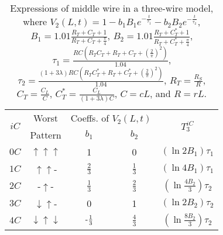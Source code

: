 \documentclass[10pt,journal]{IEEEtran}
\def\d{\downarrow}
\def\u{\uparrow}
\begin{document}
\begin{table}[!t]
\caption{Expressions of middle wire in a three-wire model, where $V_2(L,t) = 1 - b_1 B_1 e^{-\frac{t}{\tau_1}} - b_2 B_2 e^{-\frac{t}{\tau_2}}$, $B_1 = 1.01\frac{R_T+C_T+1}{R_T+C_T+\frac{\pi}{4}}$, $B_2 = 1.01\frac{R_T+C_T^\ast+1}{R_T+C_T^\ast+\frac{\pi}{4}}$, $\tau_1 = \frac{RC(R_TC_T+R_T+C_T+(\frac{2}{\pi})^2)}{1.04}$,  $\tau_2 = \frac{(1+3\lambda) RC(R_TC_T^\ast+R_T+C_T^\ast+(\frac{2}{\pi})^2)}{1.04}$,  $R_T=\frac{R_S}{R}$, $C_T=\frac{C_L}{C}$, $C_T^\ast=\frac{C_L}{(1+3\lambda)C}$, $C=cL$, and $R=rL$.} \label{tab:3dif}
\begin{center}
\begin{tabular}{|c|c|c|c|c|}
\hline
\multirow{2}{*}{$iC$} & Worst & \multicolumn{2}{|c|}{Coeffs. of $V_2(L,t)$} & \multirow{2}{*}{$T_3^{iC}$}\\
\cline{3-4}
& Pattern & $b_1$ & $b_2$ & \\
\hline
$0C$ & $\u\u\u$ & 1 & 0 & $(\ln 2B_1)\tau_1$ \\
\hline
$1C$ & $\u\u$- & $\frac{2}{3}$ & $\frac{1}{3}$ & $(\ln 4B_1)\tau_1$ \\
\hline
$2C$ & -$\u$- & $\frac{1}{3}$ & $\frac{2}{3}$ & $(\ln \frac{4B_2}{3})\tau_2$ \\
\hline
$3C$ & $\d\u$- & 0 & 1 & $(\ln 2B_2)\tau_2$ \\
\hline
$4C$ & $\d\u\d$ & $\textnormal{-}\frac{1}{3}$ & $\frac{4}{3}$ & $(\ln \frac{8B_2}{3})\tau_2$ \\
\hline
\end{tabular}
\end{center}
\end{table}
\end{document}

